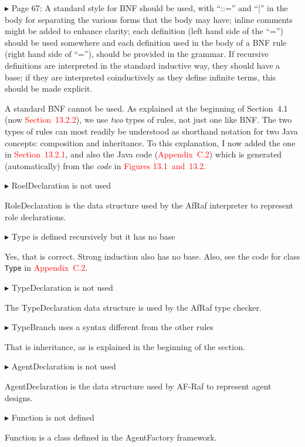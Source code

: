 \documentclass{article}
\newcommand*\R[1]{\textcolor{red}{#1}} %
\newenvironment{them}%
  {\bigskip\noindent\begingroup\color{blue}$\blacktriangleright$\enspace}%
  {\endgroup\par}
\begin{document}
\begin{them}
Page 67:
A standard style for BNF should be used, with ``::='' and ``|'' in the body for
separating the various forms that the body may have; inline comments might be
added to enhance clarity; each definition (left hand side of the ``='') should be
used somewhere and each definition used in the body of a BNF rule (right hand
side of ``=''), should be provided in the grammar. If recursive definitions are
interpreted in the standard inductive way, they should have a base; if they are
interpreted coinductively as they define infinite terms, this should be made
explicit. 
\end{them}
A standard BNF cannot be used.
As explained at the beginning of Section~4.1
  (now \R{Section~13.2.2}),
  we use \emph{two} types of rules, not just one like BNF\null.
The two types of rules can most readily be understood as shorthand
  notation for two Java concepts: composition and inheritance.
To this explanation,
  I now added the one in \R{Section~13.2.1},
  and also the Java code (\R{Appendix~C.2})
    which is generated (automatically) from the \emph{code}
      in \R{Figures 13.1~and~13.2}.


\begin{them}
RoelDeclaration is not used 
\end{them}
RoleDeclaration is the data structure used by the AfRaf interpreter to
represent role declarations.

\begin{them}
Type is defined recursively but it has no base 
\end{them}
Yes, that is correct.
Strong induction also has no base.
Also, see the code for class {\tt Type} in \R{Appendix~C.2}.

\begin{them}
TypeDeclaration is not used 
\end{them}
The TypeDeclaration data structure is used by the AfRaf type checker.

\begin{them}
TypeBranch uses a syntax different from the other rules 
\end{them}
That is inheritance,
  as is explained in the beginning of the section.

\begin{them}
AgentDeclaration is not used 
\end{them}
AgentDeclaration is the data structure used by AF-Raf to represent
  agent designs.

\begin{them}
Function is not defined 
\end{them}
Function is a class defined in the AgentFactory framework.
\end{document}
